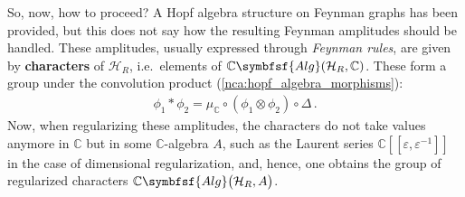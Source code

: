     So, now, how to proceed? A Hopf algebra structure on Feynman graphs has been provided, but this does not say how the resulting Feynman amplitudes should be handled. These amplitudes, usually expressed through \textit{Feynman rules}, are given by \textbf{characters} of $\mathcal{H}_R$, i.e.~elements of $\mathbb{C}\symbfsf{Alg}(\mathcal{H}_R,\mathbb{C})$. These form a group under the convolution product (\cref{nca:hopf_algebra_morphisms}):
    \begin{gather}
        \phi_1\ast\phi_2 = \mu_{\mathbb{C}}\circ(\phi_1\otimes\phi_2)\circ\Delta\,.
    \end{gather}
    Now, when regularizing these amplitudes, the characters do not take values anymore in $\mathbb{C}$ but in some $\mathbb{C}$-algebra $A$, such as the Laurent series $\mathbb{C}[[\varepsilon,\varepsilon^{-1}]]$ in the case of dimensional regularization, and, hence, one obtains the group of regularized characters $\mathbb{C}\symbfsf{Alg}\bigl(\mathcal{H}_R,A\bigr)$.

